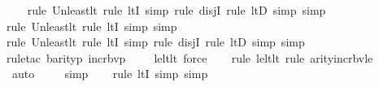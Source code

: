 \begin{isabellebody}
\ \ \ \isamarkupfalse%
{\isacharparenleft}{\kern0pt}rule\ Un{\isacharunderscore}{\kern0pt}least{\isacharunderscore}{\kern0pt}lt{\isacharcomma}{\kern0pt}\ rule\ ltI{\isacharcomma}{\kern0pt}\ simp{\isacharcomma}{\kern0pt}\ rule\ disjI{}{\isacharcomma}{\kern0pt}\ rule\ ltD{\isacharcomma}{\kern0pt}\ simp{\isacharcomma}{\kern0pt}\ simp{\isacharparenright}{\kern0pt}{\isacharplus}{\kern0pt}\isanewline
\ \ \ \isamarkupfalse%
{\isacharparenleft}{\kern0pt}rule\ Un{\isacharunderscore}{\kern0pt}least{\isacharunderscore}{\kern0pt}lt{\isacharcomma}{\kern0pt}\ rule\ ltI{\isacharcomma}{\kern0pt}\ simp{\isacharcomma}{\kern0pt}\ simp{\isacharparenright}{\kern0pt}\isanewline
\ \ \ \isamarkupfalse%
{\isacharparenleft}{\kern0pt}rule\ Un{\isacharunderscore}{\kern0pt}least{\isacharunderscore}{\kern0pt}lt{\isacharcomma}{\kern0pt}\ rule\ ltI{\isacharcomma}{\kern0pt}\ simp{\isacharcomma}{\kern0pt}\ rule\ disjI{}{\isacharcomma}{\kern0pt}\ rule\ ltD{\isacharcomma}{\kern0pt}\ simp{\isacharcomma}{\kern0pt}\ simp{\isacharparenright}{\kern0pt}\isanewline
\ \ \ \isamarkupfalse%
{\isacharparenleft}{\kern0pt}rule{\isacharunderscore}{\kern0pt}tac\ b{\isacharequal}{\kern0pt}{\isachardoublequoteopen}arity{\isacharparenleft}{\kern0pt}{\isacharparenleft}{\kern0pt}{\isasymlambda}p{\isachardot}{\kern0pt}\ incr{\isacharunderscore}{\kern0pt}bv{\isacharparenleft}{\kern0pt}p{\isacharparenright}{\kern0pt}\ {\isacharbackquote}{\kern0pt}\ {}{\isacharparenright}{\kern0pt}{\isacharcircum}{\kern0pt}{}\ {\isacharparenleft}{\kern0pt}{\isasymphi}{\isacharparenright}{\kern0pt}{\isacharparenright}{\kern0pt}{\isachardoublequoteclose}\ \ le{\isacharunderscore}{\kern0pt}lt{\isacharunderscore}{\kern0pt}lt{\isacharcomma}{\kern0pt}\ force{\isacharparenright}{\kern0pt}\isanewline
\ \ \ \isamarkupfalse%
{\isacharparenleft}{\kern0pt}rule\ le{\isacharunderscore}{\kern0pt}lt{\isacharunderscore}{\kern0pt}lt{\isacharcomma}{\kern0pt}\ rule\ arity{\isacharunderscore}{\kern0pt}incr{\isacharunderscore}{\kern0pt}bv{\isacharunderscore}{\kern0pt}le{\isacharparenright}{\kern0pt}\isanewline
\ \ \ \ \ \ \isamarkupfalse%
\ auto{\isacharbrackleft}{\kern0pt}{}{\isacharbrackright}{\kern0pt}\isanewline
\ \ \ \isamarkupfalse%
\ simp\isanewline
\ \ \ \isamarkupfalse%
{\isacharparenleft}{\kern0pt}rule\ ltI{\isacharcomma}{\kern0pt}\ simp{\isacharcomma}{\kern0pt}\ simp{\isacharparenright}{\kern0pt}\isanewline
\ \ \isamarkupfalse%

\end{isabellebody}
